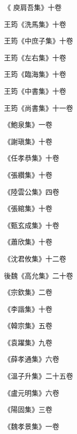 \begin{pinyinscope}
 《
 庾肩吾集》十卷



 王筠《洗馬集》十卷



 王筠《中庶子集》十卷



 王筠《左右集》十卷



 王筠《臨海集》十卷



 王筠《中書集》十卷



 王筠《尚書集》十一卷



 《鮑泉集》一卷



 《謝瑱集》十卷



 《任孝恭集》十卷



 《張纘集》十卷



 《陸雲公集》四卷



 《張綰集》十卷



 《甄玄成集》十卷



 《蕭欣集》十卷



 《沈君攸集》十二卷



 後魏《高允集》二十卷



 《宗欽集》二卷



 《李諧集》十卷



 《韓宗集》五卷



 《袁躍集》九卷



 《薛孝通集》六卷



 《溫子升集》二十五卷



 《盧元明集》六卷



 《陽固集》三卷



 《魏孝景集》一卷




\end{pinyinscope}
